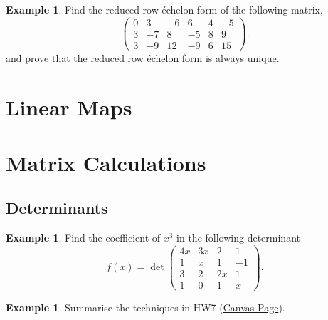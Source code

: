 \documentclass[12pt, reqno]{amsart}
\theoremstyle{plain}
\theoremstyle{definition}
\newtheorem{example}[theorem]{Example}
\theoremstyle{remark}
\numberwithin{equation}{section}
\begin{document}
\begin{example}\label{echelon}
    Find the reduced row échelon form of the following matrix,
    \begin{equation}
        \begin{pmatrix}
            0 & 3  & −6 & 6  & 4 & −5 \\
            3 & −7 & 8  & −5 & 8 & 9  \\
            3 & −9 & 12 & −9 & 6 & 15
        \end{pmatrix}.
    \end{equation}
    and prove that the reduced row échelon form is always unique.
\end{example}




\section{Linear Maps}






\section{Matrix Calculations}

\subsection{Determinants}

\begin{example}\label{det_quick_glance}
    Find the coefficient of $x^3$ in the following determinant
    \begin{equation}
        f(x) = \det  \begin{pmatrix}
            4x & 3x & 2  & 1  \\
            1  & x  & 1  & -1 \\
            3  & 2  & 2x & 1  \\
            1  & 0  & 1  & x
        \end{pmatrix}.
    \end{equation}
\end{example}

\begin{example}\label{methodologies}
    Summarise the techniques in HW7 (\href{https://oc.sjtu.edu.cn/courses/72790/assignments/312156?module_item_id=1294252}{Canvas Page}).
\end{example}
\end{document}
